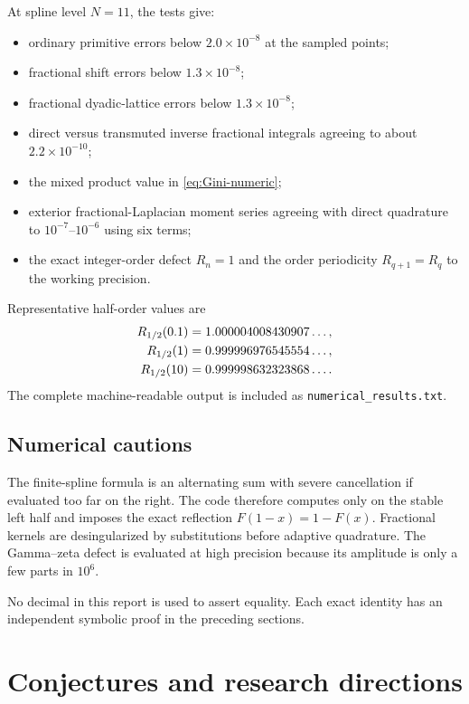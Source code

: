 \documentclass[11pt]{article}
\theoremstyle{definition}
\theoremstyle{remark}
\begin{document}
At spline level $N=11$, the tests give:
\begin{itemize}
\item ordinary primitive errors below $2.0\times10^{-8}$ at the sampled points;
\item fractional shift errors below $1.3\times10^{-8}$;
\item fractional dyadic-lattice errors below $1.3\times10^{-8}$;
\item direct versus transmuted inverse fractional integrals agreeing to about $2.2\times10^{-10}$;
\item the mixed product value in \cref{eq:Gini-numeric};
\item exterior fractional-Laplacian moment series agreeing with direct quadrature to
      $10^{-7}$--$10^{-6}$ using six terms;
\item the exact integer-order defect $R_n=1$ and the order periodicity $R_{q+1}=R_q$ to the
      working precision.
\end{itemize}

Representative half-order values are
\begin{align}
 R_{1/2}(0.1)&=1.000004008430907\ldots,\notag\\
 R_{1/2}(1)&=0.999996976545554\ldots,\notag\\
 R_{1/2}(10)&=0.999998632323868\ldots .
 \label{eq:defect-half-numeric}
\end{align}
The complete machine-readable output is included as \texttt{numerical\_results.txt}.

\subsection{Numerical cautions}

The finite-spline formula is an alternating sum with severe cancellation if evaluated too far
on the right.  The code therefore computes only on the stable left half and imposes the exact
reflection $F(1-x)=1-F(x)$.  Fractional kernels are desingularized by substitutions before
adaptive quadrature.  The Gamma--zeta defect is evaluated at high precision because its
amplitude is only a few parts in $10^6$.

No decimal in this report is used to assert equality.  Each exact identity has an independent
symbolic proof in the preceding sections.

\section{Conjectures and research directions}
\label{sec:future}
\end{document}
